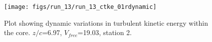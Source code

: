 \begin{figure}[H]
\centering
\texttt{[image: figs/run\_13/run\_13\_ctke\_01rdynamic]}
\caption{Plot showing dynamic variations in turbulent kinetic energy within the core. $z/c$=6.97, $V_{free}$=19.03, station 2.}
\label{fig:run_13_ctke_01rdynamic}
\end{figure}


